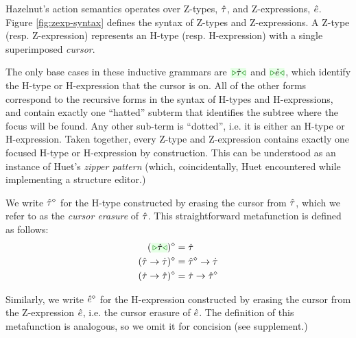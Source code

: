 Hazelnut's action semantics operates over Z-types, $\hat{\tau}$, and Z-expressions, $\hat{e}$. Figure \ref{fig:zexp-syntax} defines the syntax of Z-types and Z-expressions. A Z-type (resp. Z-expression) represents an H-type (resp. H-expression) with a single superimposed \emph{cursor}.

The only base cases in these inductive grammars are $\zwsel{\htau}$ and $\zwsel{\hexp}$, which identify the H-type or H-expression that the cursor is on. All of the other forms correspond to the recursive forms in the syntax of H-types and H-expressions, and contain exactly one ``hatted'' subterm that identifies the subtree where the focus will be found. Any other sub-term is ``dotted'', i.e. it is either an H-type or H-expression. Taken together, every Z-type and Z-expression contains exactly one focused H-type or H-expression by construction. This can be understood as an instance of Huet's \emph{zipper pattern} \cite{JFP::Huet1997} (which, coincidentally, Huet encountered while implementing a structure editor.)

We write $\hat{\tau}^{\diamond}$ for the H-type constructed by erasing the cursor from $\hat{\tau}$, which we refer to as the \emph{cursor erasure} of $\hat{\tau}$. This straightforward metafunction is defined as follows:
\begin{align*}
\removeSel{(\zwsel{\htau})} & = \htau\\
\removeSel{(\tarr{\ztau}{\htau})} & = \tarr{\removeSel{\ztau}}{\htau}\\
\removeSel{(\tarr{\htau}{\ztau})} & = \tarr{\htau}{\removeSel{\ztau}}
\end{align*}

Similarly, we write $\hat{e}^{\diamond}$ for the H-expression constructed by erasing the cursor from the Z-expression $\hat{e}$, i.e. the cursor erasure of $\hat{e}$. The definition of this metafunction is analogous, so we omit it for concision (see supplement.)

